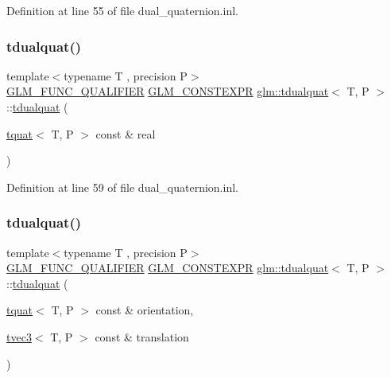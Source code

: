 Definition at line 55 of file dual\+\_\+quaternion.\+inl.

\mbox{\label{structglm_1_1tdualquat_aa873fb312be8f6ca4fc1f90dabb543eb}} 
\subsubsection{\texorpdfstring{tdualquat()}{tdualquat()}\hspace{0.1cm}{\footnotesize\ttfamily [5/12]}}
{\footnotesize\ttfamily template$<$typename T , precision P$>$ \\
\mbox{\hyperlink{setup_8hpp_a33fdea6f91c5f834105f7415e2a64407}{G\+L\+M\+\_\+\+F\+U\+N\+C\+\_\+\+Q\+U\+A\+L\+I\+F\+I\+ER}} \mbox{\hyperlink{setup_8hpp_a08b807947b47031d3a511f03f89645ad}{G\+L\+M\+\_\+\+C\+O\+N\+S\+T\+E\+X\+PR}} \mbox{\hyperlink{structglm_1_1tdualquat}{glm\+::tdualquat}}$<$ T, P $>$\+::\mbox{\hyperlink{structglm_1_1tdualquat}{tdualquat}} (\begin{DoxyParamCaption}\item[{\mbox{\hyperlink{structglm_1_1tquat}{tquat}}$<$ T, P $>$ const \&}]{real }\end{DoxyParamCaption})}



Definition at line 59 of file dual\+\_\+quaternion.\+inl.

\mbox{\label{structglm_1_1tdualquat_a602d2c96a4cecb0ac2e41a4fef10bff9}} 
\subsubsection{\texorpdfstring{tdualquat()}{tdualquat()}\hspace{0.1cm}{\footnotesize\ttfamily [6/12]}}
{\footnotesize\ttfamily template$<$typename T , precision P$>$ \\
\mbox{\hyperlink{setup_8hpp_a33fdea6f91c5f834105f7415e2a64407}{G\+L\+M\+\_\+\+F\+U\+N\+C\+\_\+\+Q\+U\+A\+L\+I\+F\+I\+ER}} \mbox{\hyperlink{setup_8hpp_a08b807947b47031d3a511f03f89645ad}{G\+L\+M\+\_\+\+C\+O\+N\+S\+T\+E\+X\+PR}} \mbox{\hyperlink{structglm_1_1tdualquat}{glm\+::tdualquat}}$<$ T, P $>$\+::\mbox{\hyperlink{structglm_1_1tdualquat}{tdualquat}} (\begin{DoxyParamCaption}\item[{\mbox{\hyperlink{structglm_1_1tquat}{tquat}}$<$ T, P $>$ const \&}]{orientation,  }\item[{\mbox{\hyperlink{structglm_1_1tvec3}{tvec3}}$<$ T, P $>$ const \&}]{translation }\end{DoxyParamCaption})}




